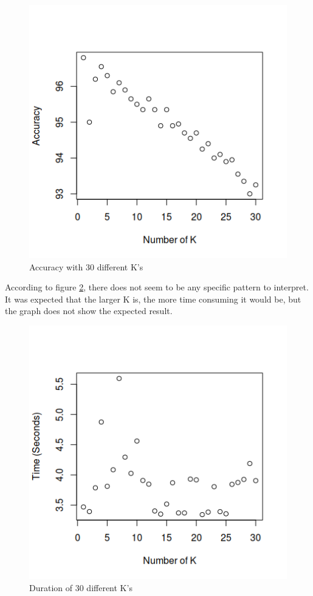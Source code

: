 \begin{figure}[H]
\centering
\includegraphics[scale=0.65]{Graphics/KNN/accuracy30K.png}
\caption{Accuracy with 30 different K's}
\label{fig:accuracy30k}
\end{figure}

According to figure \ref{fig:duration30k}, there does not seem to be any specific pattern to interpret. It was expected that the larger K is, the more time consuming it would be, but the graph does not show the expected result. 

\begin{figure}[H]
\centering
\includegraphics[scale=0.65]{Graphics/KNN/duration30K.png}
\caption{Duration of 30 different K's}
\label{fig:duration30k}
\end{figure}



